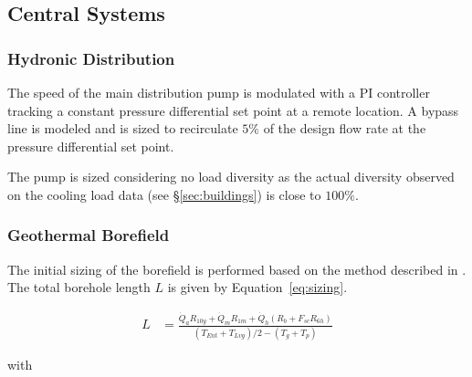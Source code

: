 \subsection{Central Systems}

\subsubsection{Hydronic Distribution}

The speed of the main distribution pump is modulated with a PI controller tracking a constant pressure differential set point at a remote location. A bypass line is modeled and is sized to recirculate $5\%$ of the design flow rate at the pressure differential set point.

The pump is sized considering no load diversity as the actual diversity observed on the cooling load data (see §\ref{sec:buildings}) is close to $100\%$.

\subsubsection{Geothermal Borefield}

The initial sizing of the borefield is performed based on the method described in \cite{Cline2020}.
The total borehole length $L$ is given by Equation~\ref{eq:sizing}.

\begin{align}
    \label{eq:sizing}
    L &= \frac{\dot{Q}_a R_{10y} + \dot{Q}_m R_{1m} + \dot{Q}_h \left( R_b + F_{sc} R_{6h} \right)}{\left( T_{Ent} + T_{Lvg} \right) / 2 - \left( T_g + T_p \right)}
\end{align}

with

